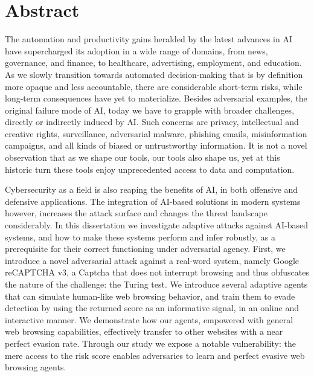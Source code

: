 \chapter{Abstract}
\label{ch:abstract}

The automation and productivity gains heralded by the latest advances in \gls{AI} have supercharged its adoption in a wide range of domains, from news, governance, and finance, to healthcare, advertising, employment, and education.
As we slowly transition towards automated decision-making that is by definition more opaque and less accountable, there are considerable short-term risks, while long-term consequences have yet to materialize.
Besides adversarial examples, the original failure mode of \gls{AI}, today we have to grapple with broader challenges, directly or indirectly induced by \gls{AI}.
Such concerns are privacy, intellectual and creative rights, surveillance, adversarial malware, phishing emails, misinformation campaigns, and all kinds of biased or untrustworthy information.
It is not a novel observation that as we shape our tools, our tools also shape us, yet at this historic turn these tools enjoy unprecedented access to data and computation.

Cybersecurity as a field is also reaping the benefits of \gls{AI}, in both offensive and defensive applications.
The integration of AI-based solutions in modern systems however, increases the attack surface and changes the threat landscape considerably.
In this dissertation we investigate adaptive attacks against AI-based systems, and how to make these systems perform and infer robustly, as a prerequisite for their correct functioning under adversarial agency.
First, we introduce a novel adversarial attack against a real-word system, namely Google reCAPTCHA v3, a Captcha that does not interrupt browsing and thus obfuscates the nature of the challenge: the Turing test.
We introduce several adaptive agents that can simulate human-like web browsing behavior, and train them to evade detection by using the returned score as an informative signal, in an online and interactive manner.
We demonstrate how our agents, empowered with general web browsing capabilities, effectively transfer to other websites with a near perfect evasion rate.
Through our study we expose a notable vulnerability: the mere access to the risk score enables adversaries to learn and perfect evasive web browsing agents.

